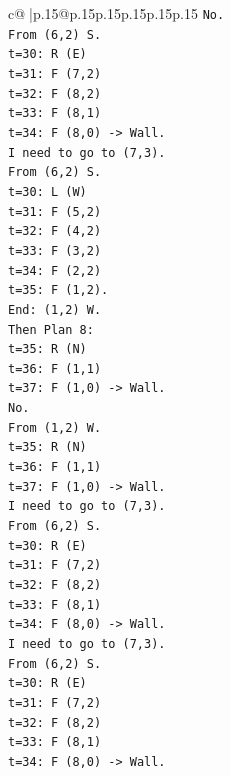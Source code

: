 \documentclass{article}
\begin{document}
{\begin{supertabular}{c@{$\;$}|p{.15\linewidth}@{}p{.15\linewidth}p{.15\linewidth}p{.15\linewidth}p{.15\linewidth}p{.15\linewidth}}
{{{\texttt{No.} \\
\texttt{From (6,2) S.} \\
\texttt{t=30: R (E)} \\
\texttt{t=31: F (7,2)} \\
\texttt{t=32: F (8,2)} \\
\texttt{t=33: F (8,1)} \\
\texttt{t=34: F (8,0) {-}> Wall.} \\
\texttt{I need to go to (7,3).} \\
\texttt{From (6,2) S.} \\
\texttt{t=30: L (W)} \\
\texttt{t=31: F (5,2)} \\
\texttt{t=32: F (4,2)} \\
\texttt{t=33: F (3,2)} \\
\texttt{t=34: F (2,2)} \\
\texttt{t=35: F (1,2).} \\
\texttt{End: (1,2) W.} \\
\texttt{Then Plan 8:} \\
\texttt{t=35: R (N)} \\
\texttt{t=36: F (1,1)} \\
\texttt{t=37: F (1,0) {-}> Wall.} \\
\texttt{No.} \\
\texttt{From (1,2) W.} \\
\texttt{t=35: R (N)} \\
\texttt{t=36: F (1,1)} \\
\texttt{t=37: F (1,0) {-}> Wall.} \\
\texttt{I need to go to (7,3).} \\
\texttt{From (6,2) S.} \\
\texttt{t=30: R (E)} \\
\texttt{t=31: F (7,2)} \\
\texttt{t=32: F (8,2)} \\
\texttt{t=33: F (8,1)} \\
\texttt{t=34: F (8,0) {-}> Wall.} \\
\texttt{I need to go to (7,3).} \\
\texttt{From (6,2) S.} \\
\texttt{t=30: R (E)} \\
\texttt{t=31: F (7,2)} \\
\texttt{t=32: F (8,2)} \\
\texttt{t=33: F (8,1)} \\
\texttt{t=34: F (8,0) {-}> Wall.} \\
}}}
\end{supertabular}}
\end{document}

